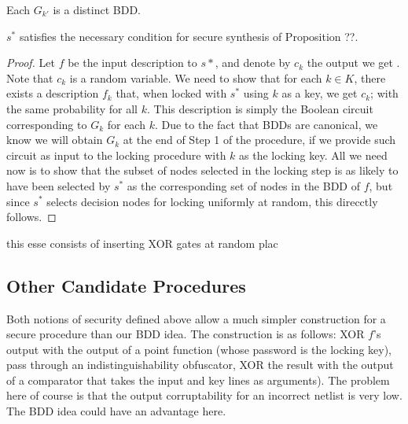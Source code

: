 \begin{lemma}
Each $G_{k'}$ is a distinct BDD.
\end{lemma}

\begin{theorem}
$s^{*}$ satisfies the necessary condition for secure synthesis of Proposition ??.
\end{theorem}

\begin{proof}
Let $f$ be the input description to $s*$, and denote by $c_k$ the output we get . Note that $c_k$ is a random variable. We need to show that for each $k\in K$, there exists a description $f_k$ that, when locked with $s^{*}$ using $k$ as a key, we get $c_k$; with the same probability for all $k$. This description is simply the Boolean circuit corresponding to $G_{k}$ for each $k$. Due to the fact that BDDs are canonical, we know we will obtain $G_{k}$ at the end of Step 1 of the procedure, if we provide such circuit as input to the locking procedure with $k$ as the locking key. All we need now is to show that the subset of nodes selected in the locking step is as likely to have been selected by $s^{*}$ as the corresponding set of nodes in the BDD of $f$, but since $s^{*}$ selects decision nodes for locking uniformly at random, this direcctly follows.
\end{proof}

this esse consists of inserting XOR gates at random plac

\subsection{Other Candidate Procedures}
Both notions of security defined above allow a much simpler construction for a secure procedure than our BDD idea. The construction is as follows: XOR $f$'s output with the output of a point function (whose password is the locking key), pass through an indistinguishability obfuscator, XOR the result with the output of a comparator that takes the input and key lines as arguments). The problem here of course is that the output corruptability for an incorrect netlist is very low. The BDD idea could have an advantage here.
